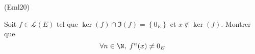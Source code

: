\begin{tiny}(Eml20)\end{tiny} Soit $f\in \mathcal{L}(E)$ tel que 
$\ker(f) \cap \Im(f) = \left\lbrace 0_E\right\rbrace$ et $x\notin \ker(f)$. Montrer que 
\begin{displaymath}
  \forall n\in \N,\; f^n(x) \neq 0_E
\end{displaymath}
